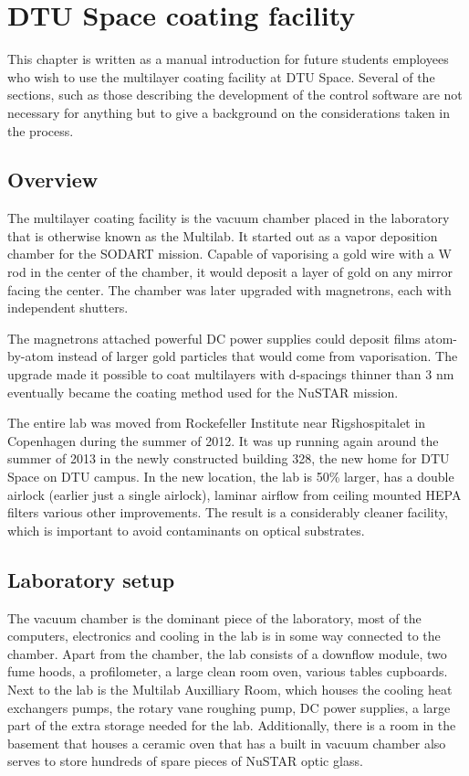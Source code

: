 \chapter{DTU Space coating facility}
This chapter is written as a manual introduction for future students employees who wish to use the multilayer coating facility at DTU Space. Several of the sections, such as those describing the development of the control software are not necessary for anything but to give a background on the considerations taken in the process.

\section{Overview}
The multilayer coating facility is the vacuum chamber placed in the laboratory that is otherwise known as the Multilab. It started out as a vapor deposition chamber for the SODART mission. Capable of vaporising a gold wire with a W rod in the center of the chamber, it would deposit a layer of gold on any mirror facing the center. The chamber was later upgraded with magnetrons, each with independent shutters.

The magnetrons attached powerful DC power supplies could deposit films atom-by-atom instead of larger gold particles that would come from vaporisation. The upgrade made it possible to coat multilayers with d-spacings thinner than 3 nm eventually became the coating method used for the NuSTAR mission.

The entire lab was moved from Rockefeller Institute near Rigshospitalet in Copenhagen during the summer of 2012. It was up running again around the summer of 2013 in the newly constructed building 328, the new home for DTU Space on DTU campus. In the new location, the lab is 50\% larger, has a double airlock (earlier just a single airlock), laminar airflow from ceiling mounted HEPA filters various other improvements. The result is a considerably cleaner facility, which is important to avoid contaminants on optical substrates.

\section{Laboratory setup}
The vacuum chamber is the dominant piece of the laboratory, most of the computers, electronics and cooling in the lab is in some way connected to the chamber. Apart from the chamber, the lab consists of a downflow module, two fume hoods, a profilometer, a large clean room oven, various tables cupboards. Next to the lab is the Multilab Auxilliary Room, which houses the cooling heat exchangers pumps, the rotary vane roughing pump, DC power supplies, a large part of the extra storage needed for the lab. Additionally, there is a room in the basement that houses a ceramic oven that has a built in vacuum chamber also serves to store hundreds of spare pieces of NuSTAR optic glass.

